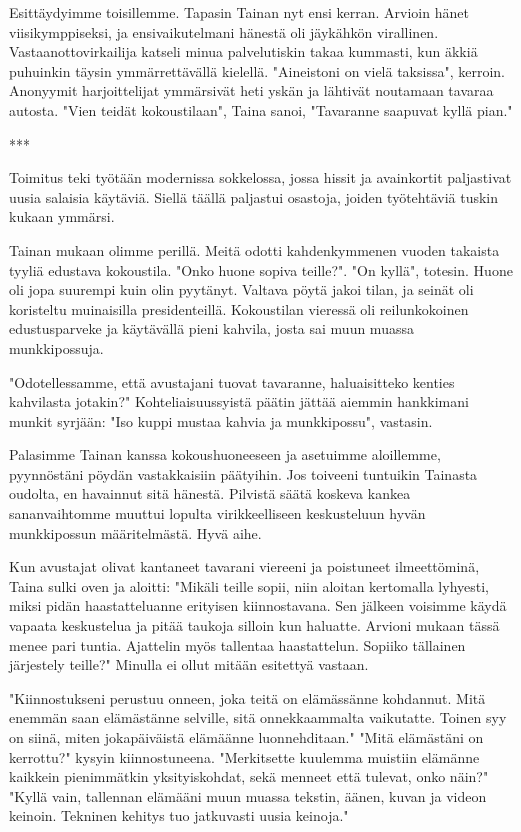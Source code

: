﻿\documentclass[a4paper, 12pt, finnish]{article}
\begin{document}
Esittäydyimme toisillemme. Tapasin Tainan nyt ensi kerran. Arvioin hänet viisikymppiseksi, ja ensivaikutelmani hänestä oli jäykähkön virallinen.
Vastaanottovirkailija katseli minua palvelutiskin takaa kummasti,
kun äkkiä puhuinkin täysin ymmärrettävällä kielellä.
"Aineistoni on vielä taksissa", kerroin. Anonyymit harjoittelijat ymmärsivät
heti yskän ja lähtivät noutamaan tavaraa autosta.
"Vien teidät kokoustilaan", Taina sanoi, "Tavaranne saapuvat kyllä pian."

***

Toimitus teki työtään modernissa sokkelossa, jossa hissit ja
avainkortit paljastivat uusia salaisia käytäviä. Siellä täällä
paljastui osastoja, joiden työtehtäviä tuskin kukaan ymmärsi.

Tainan mukaan olimme perillä. Meitä odotti kahdenkymmenen vuoden
takaista tyyliä edustava kokoustila. "Onko huone sopiva teille?".
"On kyllä", totesin. Huone oli jopa suurempi kuin olin pyytänyt.
Valtava pöytä jakoi tilan, ja seinät oli koristeltu muinaisilla
presidenteillä. Kokoustilan vieressä oli reilunkokoinen
edustusparveke ja käytävällä pieni kahvila, josta sai muun
muassa munkkipossuja.

"Odotellessamme, että avustajani tuovat tavaranne,
haluaisitteko kenties kahvilasta jotakin?" Kohteliaisuussyistä päätin
jättää aiemmin hankkimani munkit syrjään: "Iso kuppi mustaa kahvia
ja munkkipossu", vastasin.

Palasimme Tainan kanssa kokoushuoneeseen ja asetuimme aloillemme,
pyynnöstäni pöydän vastakkaisiin päätyihin.
Jos toiveeni tuntuikin Tainasta oudolta, en havainnut sitä hänestä.
Pilvistä säätä koskeva kankea sananvaihtomme muuttui lopulta
virikkeelliseen keskusteluun hyvän munkkipossun määritelmästä.
Hyvä aihe.

Kun avustajat olivat kantaneet tavarani viereeni ja poistuneet
ilmeettöminä, Taina sulki oven ja aloitti:
"Mikäli teille sopii, niin aloitan kertomalla lyhyesti,
miksi pidän haastatteluanne erityisen kiinnostavana. Sen jälkeen
voisimme käydä vapaata keskustelua ja pitää taukoja silloin kun haluatte.
Arvioni mukaan tässä menee pari tuntia. Ajattelin myös tallentaa
haastattelun. Sopiiko tällainen järjestely teille?"
Minulla ei ollut mitään esitettyä vastaan.

"Kiinnostukseni perustuu onneen, joka teitä on elämässänne kohdannut.
Mitä enemmän saan elämästänne selville, sitä onnekkaammalta vaikutatte.
Toinen syy on siinä, miten jokapäiväistä elämäänne luonnehditaan."
"Mitä elämästäni on kerrottu?" kysyin kiinnostuneena.
"Merkitsette kuulemma muistiin elämänne kaikkein pienimmätkin
yksityiskohdat, sekä menneet että tulevat, onko näin?"
"Kyllä vain, tallennan elämääni muun muassa tekstin, äänen,
kuvan ja videon keinoin. Tekninen kehitys tuo jatkuvasti
uusia keinoja."
\end{document}
